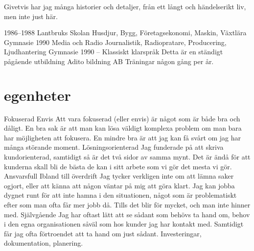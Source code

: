 \documentclass[]{cv-style}          %
\begin{document}
Givetvis har jag många historier och detaljer, från ett långt och 
händelserikt liv, men inte just här.
\begin{entrylist}
\entry
{1986--1988}
{Lantbruks Skolan {\normalfont Husdjur, Bygg, Företagsekonomi, Maskin, Växtlära }}
{Gymnasie}
{\vspace{-0.80cm}}
\entry
{1990}
{Media och Radio {\normalfont Journalistik, Radiopratare, Producering, 
Ljudhantering}}
{Gymnasie}
{\vspace{-0.8cm}}
\entry
{1990 -- }
{Klassiskt klarspråk {\normalfont Detta är en ständigt pågående utbildning}}
{Adito bildning AB}
{Träningar någon gång per år.}
{\vspace{-0.5cm}}
\end{entrylist}


\section{egenheter}

\begin{entrylist}
\entry
{\color{green} }
{Fokuserad}
{Envis}
{Att vara fokuserad (eller envis) är något som är både bra och dåligt. En bra 
sak är att man kan lösa väldigt komplexa problem om man bara har 
möjligheten att fokusera. En mindre bra är att jag kan få svårt om jag har
många störande moment.}
{\vspace{-0.8cm}}
\entry
{\color{green} }
{Lösningsorienterad}
{}
{Jag funderade på att skriva kundorienterad, samtidigt så är det två sidor
av samma mynt. Det är ändå för att kunderna skall bli de bästa de kan i sitt
arbete som vi gör det mesta vi gör.}
{\vspace{-0.4cm}}
\entry
{\color{green} }
{Ansvarsfull}
{Ibland till överdrift}
{Jag tycker verkligen inte om att lämna saker ogjort, eller att känna att någon
väntar på mig att göra klart. Jag kan jobba dygnet runt för att inte hamna i
den situationen, något som är problematiskt efter som man ofta får mer jobb då.
Tills det blir för mycket, och man inte hinner med.}
{\vspace{-0.4cm}}
\entry
{\color{green} }
{Självgående}
{}
{Jag har oftast lätt att se sådant som behövs ta hand om, behov i den
egna organisationen såväl som hos kunder jag har kontakt med. Samtidigt
får jag ofta förtroendet att ta hand om just sådant. Investeringar,
dokumentation, planering.}
{\vspace{-0.5cm}}
\end{entrylist}
\end{document}
